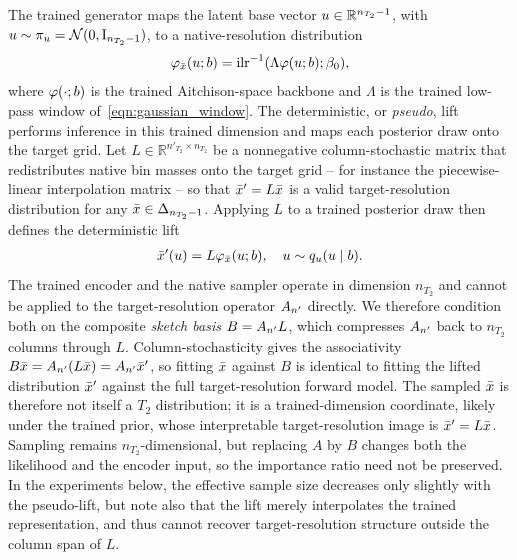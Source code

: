 The trained generator maps the latent base vector $u \in \mathbb{R}^{n_{T_2} - 1}$, with $u \sim \pi_{u} = \mathcal{N}(\mathrm{0}, \mathrm{I}_{n_{T_2} - 1})$, to a native-resolution distribution
\begin{align}\label{eqn:apx:cross_res_trained_gen}
    \varphi_{\bar{\distbn}}(\vv{u}; \signal) = \InvILR{\Lambda \varphi(\vv{u}; \signal); \beta_0},
\end{align}
where $\varphi(\cdot; b)$ is the trained Aitchison-space backbone and $\Lambda$ is the trained low-pass window of~\eqref{eqn:gaussian_window}.
The deterministic, or \textit{pseudo}, lift performs inference in this trained dimension and maps each posterior draw onto the target grid.
Let $L \in \mathbb{R}^{n'_{T_2} \times n_{T_2}}$ be a nonnegative column-stochastic matrix that redistributes native bin masses onto the target grid -- for instance the piecewise-linear interpolation matrix -- so that $\bar{x}' = L\bar{x}$ is a valid target-resolution distribution for any $\bar{x} \in \Delta_{n_{T_2} - 1}$.
Applying $L$ to a trained posterior draw then defines the deterministic lift
\begin{align}\label{eqn:apx:cross_res_deterministic_lift}
    \bar{x}'(u) = L \varphi_{\bar{x}}(u; b), \quad u \sim q_{u}(u \mid b).
\end{align}
The trained encoder and the native sampler operate in dimension $n_{T_2}$ and cannot be applied to the target-resolution operator $A_{n'}$ directly.
We therefore condition both on the composite \textit{sketch basis} $B = A_{n'} L$, which compresses $A_{n'}$ back to $n_{T_2}$ columns through $L$.
Column-stochasticity gives the associativity $B\bar{x} = A_{n'}(L\bar{x}) = A_{n'}\bar{x}'$, so fitting $\bar{x}$ against $B$ is identical to fitting the lifted distribution $\bar{x}'$ against the full target-resolution forward model.
The sampled $\bar{x}$ is therefore not itself a $T_2$ distribution; it is a trained-dimension coordinate, likely under the trained prior, whose interpretable target-resolution image is $\bar{x}' = L\bar{x}$.
Sampling remains $n_{T_2}$-dimensional, but replacing $A$ by $B$ changes both the likelihood and the encoder input, so the importance ratio need not be preserved.
In the experiments below, the effective sample size decreases only slightly with the pseudo-lift, but note also that the lift merely interpolates the trained representation, and thus cannot recover target-resolution structure outside the column span of $L$.

